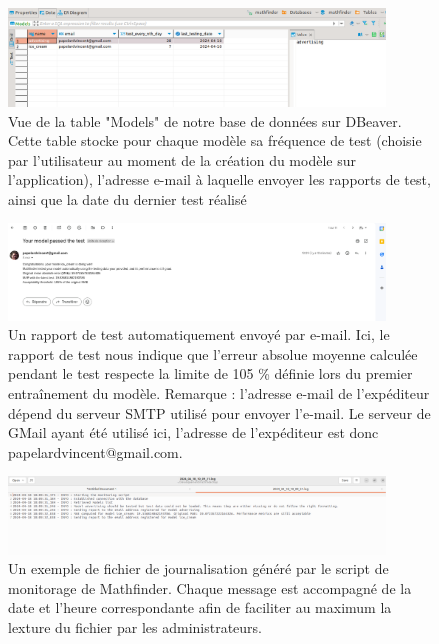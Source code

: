 \documentclass[french]{article}
\begin{document}
    \begin{figure}[h!]
        \includegraphics[width=10cm]{db}
        \centering
        \caption{Vue de la table "Models" de notre base de données sur DBeaver. Cette table stocke pour chaque modèle sa fréquence de test (choisie par l'utilisateur au moment de la création du modèle sur l'application), l'adresse e-mail à laquelle envoyer les rapports de test, ainsi que la date du dernier test réalisé}
        \centering
    \end{figure}
    \begin{figure}[h!]
        \includegraphics[width=10cm]{email_2}
        \centering
        \caption{Un rapport de test automatiquement envoyé par e-mail. Ici, le rapport de test nous indique que l'erreur absolue moyenne calculée pendant le test respecte la limite de 105 \% définie lors du premier entraînement du modèle. Remarque : l'adresse e-mail de l'expéditeur dépend du serveur SMTP utilisé pour envoyer l'e-mail. Le serveur de GMail ayant été utilisé ici, l'adresse de l'expéditeur est donc papelardvincent@gmail.com.}
        \centering
        \label{fig:email}
    \end{figure}
    \begin{figure}[h!]
        \includegraphics[width=10cm]{log}
        \centering
        \caption{Un exemple de fichier de journalisation généré par le script de monitorage de Mathfinder. Chaque message est accompagné de la date et l'heure correspondante afin de faciliter au maximum la lexture du fichier par les administrateurs.}
        \centering
    \end{figure}
\end{document}
